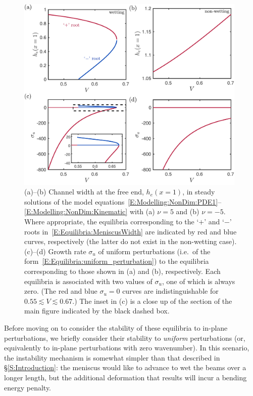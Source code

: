 \documentclass{jfm}
\begin{document}
\begin{figure}
\centering
\includegraphics[width =0.98\textwidth]{figures/fig5_equilibria.pdf}
\caption{(a)--(b) Channel width at the free end, $h_e(x = 1)$, in steady solutions of the model equations~\eqref{E:Modelling:NonDim:PDE1}--\eqref{E:Modelling:NonDim:Kinematic} with (a) $\nu = 5$ and (b) $\nu = -5$. Where appropriate, the equilibria corresponding to the `$+$' and `$-$' roots in~\eqref{E:Equilibria:MeniscusWidth} are indicated by red and blue curves, respectively (the latter do not exist in the non-wetting case). (c)--(d) Growth rate $\sigma_u$ of uniform perturbations (i.e.~of the form~\eqref{E:Equilibria:uniform_perturbation}) to the equilibria corresponding to those shown in (a) and (b), respectively. Each equilibria is associated with two values of $\sigma_u$, one of which is always zero. (The red and blue $\sigma_u = 0$ curves are indistinguishable for $0.55 \lesssim V \lesssim 0.67$.) The inset in (c) is a close up of the section of the main figure indicated by the black dashed box.}\label{fig:Equilibria}
\end{figure}

Before moving on to consider the stability of these equilibria to in-plane perturbations, we briefly consider their stability to \textit{uniform} perturbations (or, equivalently to in-plane perturbations with zero wavenumber). In this scenario, the instability mechanism is somewhat simpler than that described in \S\ref{S:Introduction}: the meniscus would like to advance to wet the beams over a longer length, but the additional deformation that results will incur a bending energy penalty.
\end{document}

